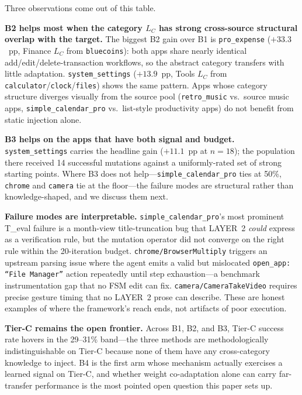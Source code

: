 Three observations come out of this table.

\textbf{B2 helps most when the category $L_C$ has strong cross-source structural overlap with the target.} The biggest B2 gain over B1 is \texttt{pro\_expense} ($+33.3$~pp, Finance $L_C$ from \texttt{bluecoins}): both apps share nearly identical add/edit/delete-transaction workflows, so the abstract category transfers with little adaptation. \texttt{system\_settings} ($+13.9$~pp, Tools $L_C$ from \texttt{calculator}/\texttt{clock}/\texttt{files}) shows the same pattern. Apps whose category structure diverges visually from the source pool (\texttt{retro\_music} vs.\ source music apps, \texttt{simple\_calendar\_pro} vs.\ list-style productivity apps) do not benefit from static injection alone.

\textbf{B3 helps on the apps that have both signal and budget.} \texttt{system\_settings} carries the headline gain ($+11.1$~pp at $n{=}18$); the population there received 14 successful mutations against a uniformly-rated set of strong starting points. Where B3 does not help---\texttt{simple\_calendar\_pro} ties at 50\%, \texttt{chrome} and \texttt{camera} tie at the floor---the failure modes are structural rather than knowledge-shaped, and we discuss them next.

\textbf{Failure modes are interpretable.} \texttt{simple\_calendar\_pro}'s most prominent T\_eval failure is a month-view title-truncation bug that LAYER~2 \emph{could} express as a verification rule, but the mutation operator did not converge on the right rule within the 20-iteration budget. \texttt{chrome/BrowserMultiply} triggers an upstream parsing issue where the agent emits a valid but mislocated \texttt{open\_app: ``File Manager''} action repeatedly until step exhaustion---a benchmark instrumentation gap that no FSM edit can fix. \texttt{camera/CameraTakeVideo} requires precise gesture timing that no LAYER~2 prose can describe. These are honest examples of where the framework's reach ends, not artifacts of poor execution.

\textbf{Tier-C remains the open frontier.} Across B1, B2, and B3, Tier-C success rate hovers in the 29--31\% band---the three methods are methodologically indistinguishable on Tier-C because none of them have any cross-category knowledge to inject. B4 is the first arm whose mechanism actually exercises a learned signal on Tier-C, and whether weight co-adaptation alone can carry far-transfer performance is the most pointed open question this paper sets up.

